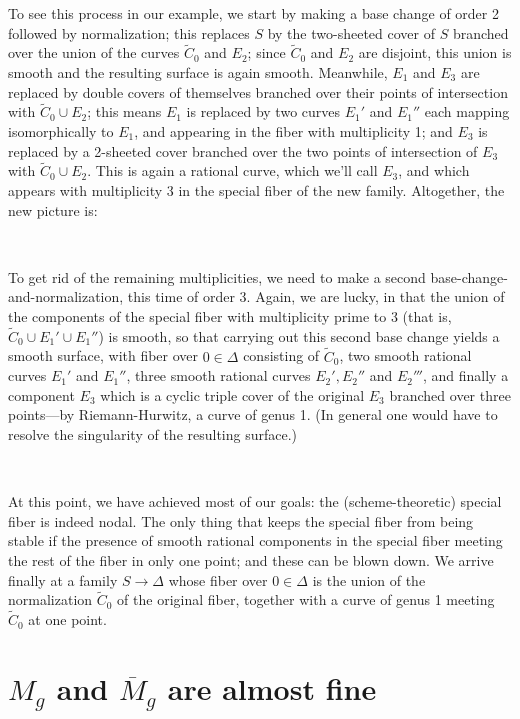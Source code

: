 To see this process in our example, we start by making a base change of order 2 followed by normalization; this replaces $S$ by the two-sheeted cover of $S$ branched over the union of the curves $\tilde C_0$ and $E_2$; since $\tilde C_0$ and $E_2$ are disjoint, this union is smooth and the resulting surface is again smooth. Meanwhile, $E_1$ and $E_3$ are replaced by double covers of themselves branched over their points of intersection with $\tilde C_0 \cup E_2$; this means $E_1$ is replaced by two curves $E_1'$ and $E_1''$ each mapping isomorphically to $E_1$, and appearing in the fiber with multiplicity 1; and $E_3$ is replaced by a 2-sheeted cover branched over the two points of intersection of $E_3$ with $\tilde C_0 \cup E_2$. This is again a rational curve, which we'll call $E_3$, and which appears with multiplicity 3 in the special fiber of the new family. Altogether, the new picture is:

\

To get rid of the remaining multiplicities, we need to make a second base-change-and-normalization, this time of order 3. Again, we are lucky, in that the union of the components of the special fiber with multiplicity prime to 3 (that is, $\tilde C_0 \cup E_1' \cup E_1''$) is smooth, so that carrying out this second base change yields a smooth surface, with fiber over $0 \in \Delta$ consisting of $\tilde C_0$, two smooth rational curves $E_1'$ and $E_1''$, three smooth rational curves $E_2', E_2''$ and $E_2'''$, and finally a component $E_3$ which is a cyclic triple cover of the original $E_3$ branched over three points---by Riemann-Hurwitz, a curve of genus 1. (In general one would have to resolve the singularity of the resulting surface.)

\

At this point, we have achieved most of our goals: the (scheme-theoretic) special fiber is indeed nodal. The only thing that keeps the special fiber from being stable if the presence of smooth rational components in the special fiber meeting the rest of the fiber in only one point; and these can be blown down. We arrive finally at a family $S \to \Delta$ whose fiber over $0 \in \Delta$ is the union of the normalization $\tilde C_0$ of the original fiber, together with a curve of genus 1 meeting $\tilde C_0$ at one point.

\section{$M_g$ and $\overline M_g$ are almost fine}\label{almost fine}


